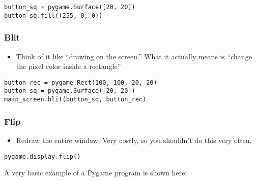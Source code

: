 \documentclass[letterpaper,10pt,english]{/usr/local/lib/python2.7/dist-packages/sphinx/texinputs/sphinxhowto}
\begin{document}
\begin{verbatim}
button_sq = pygame.Surface([20, 20])
button_sq.fill((255, 0, 0))
\end{verbatim}\subsubsection{Blit}\begin{itemize}
\item
  Think of it like ``drawing on the screen.'' What it actually means is
  ``change the pixel color inside a rectangle''
\end{itemize}\begin{verbatim}
button_rec = pygame.Rect(100, 100, 20, 20)
button_sq = pygame.Surface([20, 20])
main_screen.blit(button_sq, button_rec)
\end{verbatim}\subsubsection{Flip}\begin{itemize}
\item
  Redraw the entire window. Very costly, so you shouldn't do this very
  often.
\end{itemize}\begin{verbatim}
pygame.display.flip()
\end{verbatim}A very basic example of a Pygame program is shown here:

\end{document}
